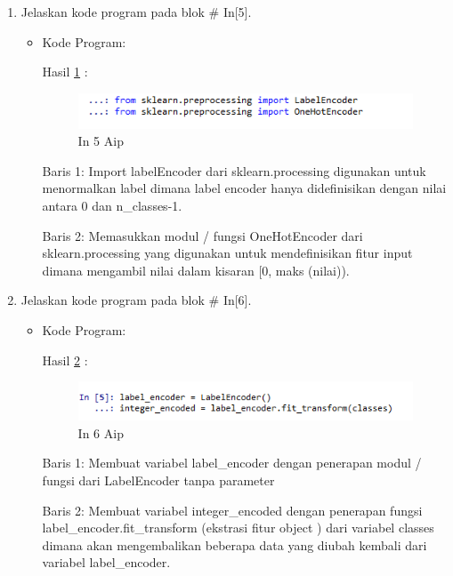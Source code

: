 \begin{enumerate}
\item Jelaskan kode program pada blok \# In[5].
\begin{itemize}
\item Kode Program:

\par Hasil \ref{in5aip} :
\begin{figure}[!hbtp]
\centering
\includegraphics[scale=0.7]{figures/AIP/prak5.PNG}
\caption{In 5 Aip}
\label{in5aip}
\end{figure}
\par Baris 1: Import labelEncoder dari sklearn.processing digunakan untuk menormalkan label dimana label encoder hanya didefinisikan dengan nilai antara 0 dan n\_classes-1.
\par Baris 2: Memasukkan modul / fungsi OneHotEncoder dari sklearn.processing yang digunakan untuk mendefinisikan fitur input dimana mengambil nilai dalam kisaran [0, maks (nilai)).
\end{itemize}
\par

\item Jelaskan kode program pada blok \# In[6].
\begin{itemize}
\item Kode Program:

\par Hasil \ref{in6aip} :
\begin{figure}[!hbtp]
\centering
\includegraphics[scale=0.7]{figures/AIP/prak6.PNG}
\caption{In 6 Aip}
\label{in6aip}
\end{figure}
\par Baris 1: Membuat variabel label\_encoder dengan penerapan modul / fungsi dari LabelEncoder tanpa parameter
\par Baris 2: Membuat variabel integer\_encoded dengan penerapan fungsi label\_encoder.fit\_transform (ekstrasi fitur object ) dari variabel classes dimana akan mengembalikan beberapa data yang diubah kembali dari variabel label\_encoder.
\end{itemize}
\par


\end{enumerate}
